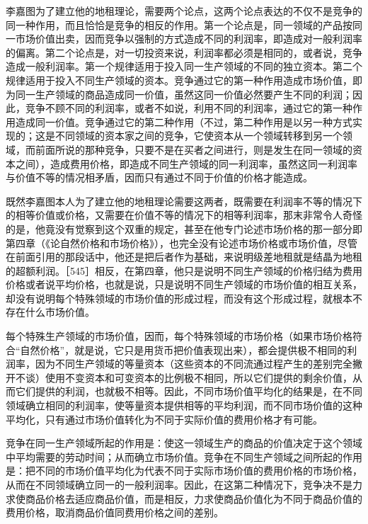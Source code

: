 李嘉图为了建立他的地租理论，需要两个论点，这两个论点表达的不仅不是竞争的同一种作用，而且恰恰是竞争的相反的作用。第一个论点是，同一领域的产品按同一市场价值出卖，因而竞争以强制的方式造成不同的利润率，即造成对一般利润率的偏离。第二个论点是，对一切投资来说，利润率都必须是相同的，或者说，竞争造成一般利润率。第一个规律适用于投入同一生产领域的不同的独立资本。第二个规律适用于投入不同生产领域的资本。竞争通过它的第一种作用造成市场价值，即为同一生产领域的商品造成同一价值，虽然这同一价值必然要产生不同的利润；因此，竞争不顾不同的利润率，或者不如说，利用不同的利润率，通过它的第一种作用造成同一价值。竞争通过它的第二种作用（不过，第二种作用是以另一种方式实现的；这是不同领域的资本家之间的竞争，它使资本从一个领域转移到另一个领域，而前面所说的那种竞争，只要不是在买者之间进行，则是发生在同一领域的资本之间），造成费用价格，即造成不同生产领域的同一利润率，虽然这同一利润率与价值不等的情况相矛盾，因而只有通过不同于价值的价格才能造成。

既然李嘉图本人为了建立他的地租理论需要这两者，既需要在利润率不等的情况下的相等价值或价格，又需要在价值不等的情况下的相等利润率，那末非常令人奇怪的是，他竟没有觉察到这个双重的规定，甚至在他专门论述市场价格的那一部分即第四章（《论自然价格和市场价格》），也完全没有论述市场价格或市场价值，尽管在前面引用的那段话中，他还是把后者作为基础，来说明级差地租就是结晶为地租的超额利润。［545］相反，在第四章，他只是说明不同生产领域的价格归结为费用价格或者说平均价格，也就是说，只是说明不同生产领域的市场价值的相互关系，却没有说明每个特殊领域的市场价值的形成过程，而没有这个形成过程，就根本不存在什么市场价值。

每个特殊生产领域的市场价值，因而，每个特殊领域的市场价格（如果市场价格符合“自然价格”，就是说，它只是用货币把价值表现出来），都会提供极不相同的利润率，因为不同生产领域的等量资本（这些资本的不同流通过程产生的差别完全撇开不谈）使用不变资本和可变资本的比例极不相同，所以它们提供的剩余价值，从而它们提供的利润，也就极不相等。因此，不同市场价值平均化的结果是，在不同领域确立相同的利润率，使等量资本提供相等的平均利润，而不同市场价值的这种平均化，只有通过市场价值转化为不同于实际价值的费用价格才有可能。

竞争在同一生产领域所起的作用是：使这一领域生产的商品的价值决定于这个领域中平均需要的劳动时间；从而确立市场价值。竞争在不同生产领域之间所起的作用是：把不同的市场价值平均化为代表不同于实际市场价值的费用价格的市场价格，从而在不同领域确立同一的一般利润率。因此，在这第二种情况下，竞争决不是力求使商品价格去适应商品价值，而是相反，力求使商品价值化为不同于商品价值的费用价格，取消商品价值同费用价格之间的差别。

